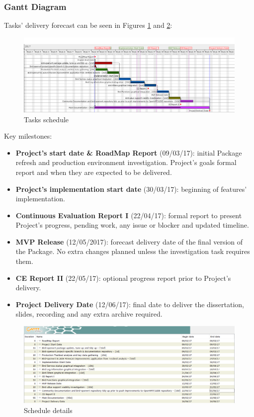 \subsubsection{Gantt Diagram}
Tasks' delivery forecast can be seen in Figures  \ref{fig:general_gantt} and \ref{fig:detail_gantt}:

\begin{landscape}

\begin{figure}[h!]
\centering
    \includegraphics[width=\hsize]{images/gantt}
    \caption{Tasks schedule}
    \label{fig:general_gantt}
\end{figure}

Key milestones:
\begin{itemize}
    \item \textbf{Project's start date \& RoadMap Report} (09/03/17): initial Package refresh and production environment investigation. Project's goals formal report and when they are expected to be delivered.
    \item \textbf{Project's implementation start date} (30/03/17): beginning of features' implementation.
    \item \textbf{Continuous Evaluation Report I} (22/04/17): formal report to present Project's progress, pending work, any issue or blocker and updated  timeline.
    \item \textbf{MVP Release} (12/05/2017): forecast delivery date of the final version of the Package. No extra changes planned unless the investigation task requires them.
    \item \textbf{CE Report II} (22/05/17): optional progress report prior to Project's delivery.
    \item \textbf{Project Delivery Date} (12/06/17): final date to deliver the dissertation, slides, recording and any extra archive required.
\end{itemize} 

\begin{figure}[h!]
    \includegraphics[width=\hsize]{images/gantt_data}
    \caption{Schedule details}
    \label{fig:detail_gantt}
\end{figure}
\end{landscape}


